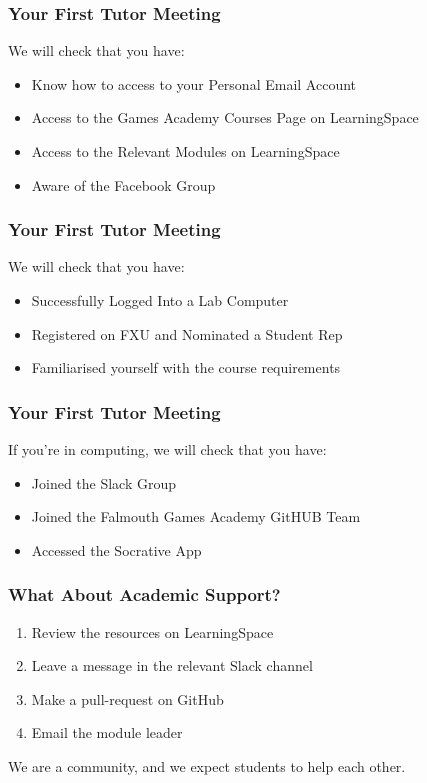 \begin{frame}
	\frametitle{Your First Tutor Meeting}	
	
	We will check that you have:
	
	\begin{itemize}
	\item Know how to access to your Personal Email Account
	\item Access to the Games Academy Courses Page on LearningSpace
	\item Access to the Relevant Modules on LearningSpace
	\item Aware of the Facebook Group
	\end{itemize}
\end{frame}

\begin{frame}
	\frametitle{Your First Tutor Meeting}	
	
	We will check that you have:
	
	\begin{itemize}
	\item Successfully Logged Into a Lab Computer
	\item Registered on FXU and Nominated a Student Rep
	\item Familiarised yourself with the course requirements
	\end{itemize}
\end{frame}

\begin{frame}
	\frametitle{Your First Tutor Meeting}	
	
	If you're in computing, we will check that you have:
	
	\begin{itemize}
	\item Joined the Slack Group
	\item Joined the Falmouth Games Academy GitHUB Team
	\item Accessed the Socrative App
	\end{itemize}
\end{frame}


\begin{frame}
	\frametitle{What About Academic Support?}	
	\begin{enumerate}
		\item Review the resources on LearningSpace
		\item Leave a message in the relevant Slack channel
		\item Make a pull-request on GitHub
		\item Email the module leader
	\end{enumerate}
	
	We are a community, and we expect students to help each other.
\end{frame}

